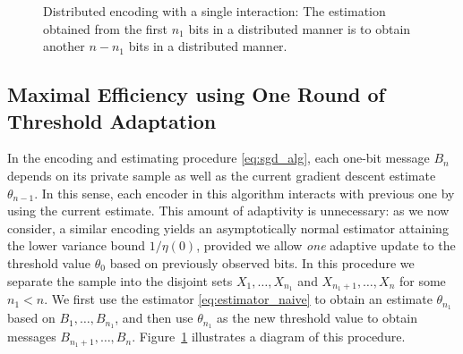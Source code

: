 \begin{figure}
\begin{center}
\end{center}
\caption{Distributed encoding with a single interaction: The estimation obtained from the first $n_1$ bits in a distributed manner is to obtain another $n-n_1$ bits in a distributed manner. 
\label{fig:one_round}
}
\end{figure}

\subsection{Maximal Efficiency using One Round of Threshold Adaptation}


In the encoding and estimating procedure \eqref{eq:sgd_alg}, each one-bit
message $B_n$ depends on its private sample as well as the current gradient
descent estimate $\theta_{n-1}$. In this sense, each encoder in this
algorithm interacts with previous one by using the current estimate.  This
amount of adaptivity is unnecessary: as we now consider, a similar encoding
yields an asymptotically normal estimator attaining the lower variance bound
$1/\eta(0)$, provided we allow \emph{one} adaptive update to the threshold
value $\theta_0$ based on previously observed bits.
%
In this procedure we separate the sample into the disjoint sets
$X_1,\ldots,X_{n_1}$ and $X_{n_1+1},\ldots,X_n$ for some $n_1 < n$.  We
first use the estimator \eqref{eq:estimator_naive} to obtain an estimate
${\theta}_{n_1}$ based on $B_1,\ldots,B_{n_1}$, and then use
${\theta}_{n_1}$ as the new threshold value to obtain messages $B_{n_1+1},
\ldots, B_n$. Figure~\ref{fig:one_round} illustrates a diagram of this
procedure.

